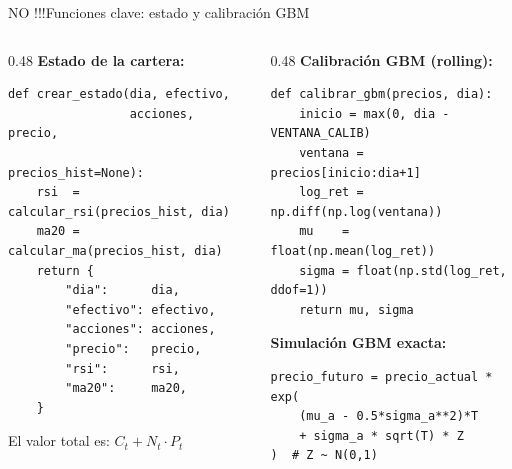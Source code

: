 \documentclass[aspectratio=169, 10pt]{beamer}
\begin{document}
\begin{frame}[fragile]{NO !!!Funciones clave: estado y calibración GBM}
  \begin{columns}[T]
    \begin{column}{0.48\textwidth}
      \textbf{Estado de la cartera:}
\begin{lstlisting}
def crear_estado(dia, efectivo,
                 acciones, precio,
                 precios_hist=None):
    rsi  = calcular_rsi(precios_hist, dia)
    ma20 = calcular_ma(precios_hist, dia)
    return {
        "dia":      dia,
        "efectivo": efectivo,
        "acciones": acciones,
        "precio":   precio,
        "rsi":      rsi,
        "ma20":     ma20,
    }
\end{lstlisting}
      \small
      El valor total es: $C_t + N_t \cdot P_t$
    \end{column}
    \begin{column}{0.48\textwidth}
      \textbf{Calibración GBM (rolling):}
\begin{lstlisting}
def calibrar_gbm(precios, dia):
    inicio = max(0, dia - VENTANA_CALIB)
    ventana = precios[inicio:dia+1]
    log_ret = np.diff(np.log(ventana))
    mu    = float(np.mean(log_ret))
    sigma = float(np.std(log_ret, ddof=1))
    return mu, sigma
\end{lstlisting}
      \vspace{0.2cm}
      \textbf{Simulación GBM exacta:}
\begin{lstlisting}
precio_futuro = precio_actual * exp(
    (mu_a - 0.5*sigma_a**2)*T
    + sigma_a * sqrt(T) * Z
)  # Z ~ N(0,1)
\end{lstlisting}
    \end{column}
  \end{columns}
\end{frame}
\end{document}
